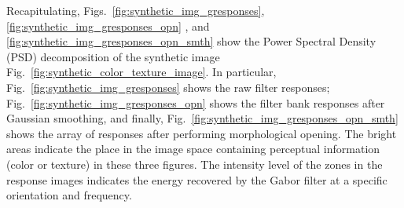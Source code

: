 Recapitulating, Figs.\ \ref{fig:synthetic_img_gresponses}, \ref{fig:synthetic_img_gresponses_opn}  , and \ref{fig:synthetic_img_gresponses_opn_smth}  show the Power Spectral Density (PSD) decomposition of the synthetic image Fig.\ \ref{fig:synthetic_color_texture_image}. In particular, Fig.\ \ref{fig:synthetic_img_gresponses} shows the raw filter responses; Fig.\ \ref{fig:synthetic_img_gresponses_opn} shows the filter bank responses after Gaussian smoothing, and finally, Fig.\ \ref{fig:synthetic_img_gresponses_opn_smth} shows the array of responses after performing morphological opening. The bright areas indicate the place in the image space containing perceptual information (color or texture) in these three figures. The intensity level of the zones in the response images indicates the energy recovered by the Gabor filter at a specific orientation and frequency. 


%
%

